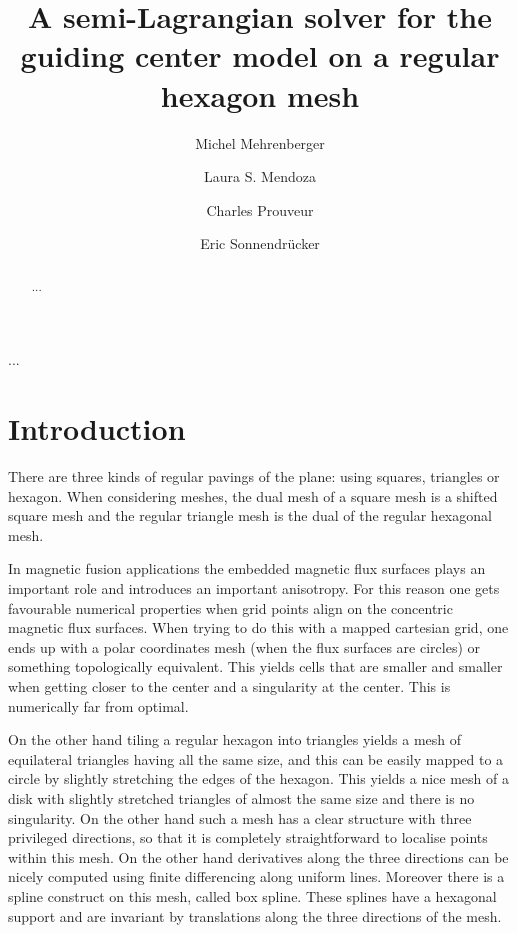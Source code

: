 \documentclass[proc]{edpsmath}
\begin{document}
\title{A semi-Lagrangian solver for the guiding center model on a regular hexagon mesh}%
%
\author{Michel Mehrenberger} \address{...} %
\author{Laura S. Mendoza} \address{Max-Planck-Institut f\"{u}r Plasmaphysik; } 
\author{Charles Prouveur}\address{...} %
\author{Eric Sonnendr\"{u}cker}
%
%

\begin{abstract} ... \end{abstract}
\begin{resume} ... \end{resume}

\maketitle


\section*{Introduction}

There are three kinds of regular pavings of the plane: using squares, triangles or hexagon. When considering meshes, the dual mesh of a square mesh is a shifted square mesh and the regular triangle mesh is the dual of the regular hexagonal mesh.

In magnetic fusion applications the embedded magnetic flux surfaces plays an important role and introduces an important anisotropy. For this reason one gets favourable numerical properties when grid points align on the concentric magnetic flux surfaces. When trying to do this with a mapped cartesian grid, one ends up with a polar coordinates mesh (when the flux surfaces are circles) or something topologically equivalent. This yields cells that are smaller and smaller when getting closer to the center and a singularity at the center. This is numerically far from optimal. 

On the other hand tiling a regular hexagon into triangles yields a mesh of equilateral triangles having all the same size, and this can be easily mapped to a circle by slightly stretching the edges of the hexagon. This yields a nice mesh of a disk with slightly stretched triangles of almost the same size and there is no singularity. 
On the other hand such a mesh has a clear structure with three privileged directions, so that it is completely straightforward to localise points within this mesh. On the other hand derivatives along the three directions can be nicely computed using finite differencing along uniform lines. Moreover there is a spline construct on this mesh, called box spline. These splines have a hexagonal support and are invariant by translations along the three directions of the mesh.
\end{document}
